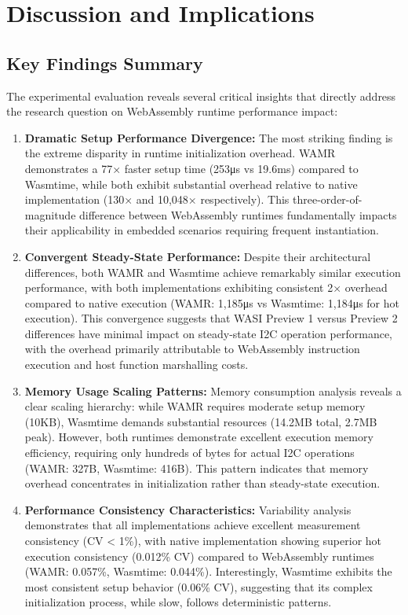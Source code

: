 \section{Discussion and Implications}
\label{sec:eval-discussion}

\subsection{Key Findings Summary}
\label{subsec:eval-discussion-keyfindings}

The experimental evaluation reveals several critical insights that directly address the research question on WebAssembly runtime performance impact:
\begin{enumerate}
    \item \textbf{Dramatic Setup Performance Divergence:} The most striking finding is the extreme disparity in runtime initialization overhead. WAMR demonstrates a 77× faster setup time (253μs vs 19.6ms) compared to Wasmtime, while both exhibit substantial overhead relative to native implementation (130× and 10,048× respectively). This three-order-of-magnitude difference between WebAssembly runtimes fundamentally impacts their applicability in embedded scenarios requiring frequent instantiation.
    \item \textbf{Convergent Steady-State Performance:} Despite their architectural differences, both WAMR and Wasmtime achieve remarkably similar execution performance, with both implementations exhibiting consistent 2× overhead compared to native execution (WAMR: 1,185μs vs Wasmtime: 1,184μs for hot execution). This convergence suggests that WASI Preview 1 versus Preview 2 differences have minimal impact on steady-state I2C operation performance, with the overhead primarily attributable to WebAssembly instruction execution and host function marshalling costs.
    \item \textbf{Memory Usage Scaling Patterns:} Memory consumption analysis reveals a clear scaling hierarchy: while WAMR requires moderate setup memory (10KB), Wasmtime demands substantial resources (14.2MB total, 2.7MB peak). However, both runtimes demonstrate excellent execution memory efficiency, requiring only hundreds of bytes for actual I2C operations (WAMR: 327B, Wasmtime: 416B). This pattern indicates that memory overhead concentrates in initialization rather than steady-state execution.
    \item \textbf{Performance Consistency Characteristics:} Variability analysis demonstrates that all implementations achieve excellent measurement consistency (CV < 1\%), with native implementation showing superior hot execution consistency (0.012\% CV) compared to WebAssembly runtimes (WAMR: 0.057\%, Wasmtime: 0.044\%). Interestingly, Wasmtime exhibits the most consistent setup behavior (0.06\% CV), suggesting that its complex initialization process, while slow, follows deterministic patterns.

\end{enumerate}
